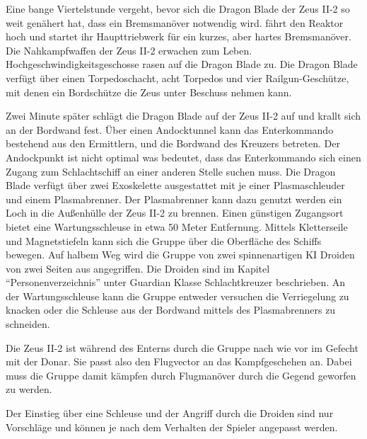 Eine bange Viertelstunde vergeht, bevor sich die Dragon Blade der Zeus II-2 so weit genähert hat, dass ein Bremsmanöver notwendig wird. \xl{} fährt den Reaktor hoch und startet ihr Haupttriebwerk für ein kurzes, aber hartes Bremsmanöver. Die Nahkampfwaffen der Zeus II-2 erwachen zum Leben. Hochgeschwindigkeitsgeschosse rasen auf die Dragon Blade zu. Die Dragon Blade verfügt über einen Torpedoschacht, acht Torpedos und vier Railgun-Geschütze, mit denen ein Bordschütze die Zeus unter Beschuss nehmen kann.

Zwei Minute später schlägt die Dragon Blade auf der Zeus II-2 auf und krallt sich an der Bordwand fest. Über einen Andocktunnel kann das Enterkommando bestehend aus den Ermittlern, \xl{} und \ml{} die Bordwand des Kreuzers betreten. Der Andockpunkt ist nicht optimal was bedeutet, dass das Enterkommando sich einen Zugang zum Schlachtschiff an einer anderen Stelle suchen muss. Die Dragon Blade verfügt über zwei Exoskelette ausgestattet mit je einer Plasmaschleuder und einem Plasmabrenner. Der Plasmabrenner kann dazu genutzt werden ein Loch in die Außenhülle der Zeus II-2 zu brennen. Einen günstigen Zugangsort bietet eine Wartungsschleuse in etwa 50 Meter Entfernung. Mittels Kletterseile und Magnetstiefeln kann sich die Gruppe über die Oberfläche des Schiffs bewegen. Auf halbem Weg wird die Gruppe von zwei spinnenartigen KI Droiden von zwei Seiten aus angegriffen. Die Droiden sind im Kapitel "`Personenverzeichnis"' unter Guardian Klasse Schlachtkreuzer beschrieben. An der Wartungsschleuse kann die Gruppe entweder versuchen die Verriegelung zu knacken oder die Schleuse aus der Bordwand mittels des Plasmabrenners zu schneiden.

\begin{remarks}
	Die Zeus II-2 ist während des Enterns durch die Gruppe nach wie vor im Gefecht mit der Donar. Sie passt also den Flugvector an das Kampfgeschehen an. Dabei muss die Gruppe damit kämpfen durch Flugmanöver durch die Gegend geworfen zu werden.

	Der Einstieg über eine Schleuse und der Angriff durch die Droiden sind nur Vorschläge und können je nach dem Verhalten der Spieler angepasst werden.
\end{remarks}
